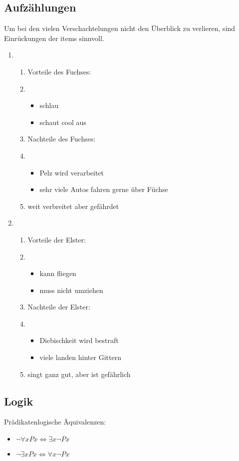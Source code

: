 \documentclass[a4paper, pdftex, ngerman, 11pt]{article}
\begin{document}
\subsection{Aufzählungen}
Um bei den vielen Verschachtelungen nicht den Überblick zu verlieren, sind Einrückungen der items sinnvoll.
\begin{enumerate}
  \item 
  \begin{enumerate}
    \item Vorteile des Fuchses:
    \item
    \begin{itemize}
      \item schlau
      \item schaut cool aus
    \end{itemize}
    \item Nachteile des Fuchses:
    \item
    \begin{itemize}
      \item Pelz wird verarbeitet
      \item sehr viele Autos fahren gerne über Füchse
    \end{itemize}
    \item weit verbreitet aber gefährdet
  \end{enumerate}
  \item
  \begin{enumerate}
    \item Vorteile der Elster:
    \item
    \begin{itemize}
      \item kann fliegen
      \item muss nicht umziehen
    \end{itemize}
    \item Nachteile der Elster:
    \item
    \begin{itemize}
      \item Diebischkeit wird bestraft
      \item viele landen hinter Gittern
    \end{itemize}
      \item singt ganz gut, aber ist gefährlich
  \end{enumerate}
\end{enumerate}

\subsection{Logik}
Prädikatenlogische Äquivalenzen:
\begin{itemize}
	\item $\lnot\forall xPx \Leftrightarrow \exists x\lnot Px$
	\item $\lnot\exists xPx \Leftrightarrow \forall x \lnot Px$
\end{itemize}
\end{document}
